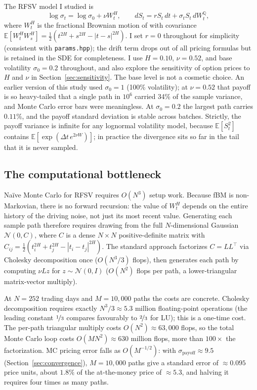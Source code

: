 The RFSV model I studied is \citep{gatheral2018volatility}
\begin{equation}
  \log\sigma_t = \log\sigma_0 + \nu W_t^H, \qquad
  dS_t = r S_t\,dt + \sigma_t S_t\, dW_t^{\mathbb{Q}},
\end{equation}
where $W_t^H$ is the fractional Brownian motion of \citet{mandelbrot1968fractional}
with covariance $\mathbb{E}[W_t^H W_s^H] = \tfrac{1}{2}(t^{2H}+s^{2H}-|t-s|^{2H})$.
I set $r = 0$ throughout for simplicity (consistent with \texttt{params.hpp}); the
drift term drops out of all pricing formulas but is retained in the SDE for
completeness.
I use $H = 0.10$, $\nu = 0.52$, and base volatility $\sigma_0 = 0.2$ throughout, and
also explore the sensitivity of option prices to $H$ and $\nu$ in
Section~\ref{sec:sensitivity}.  The base level is not a cosmetic choice.  An earlier
version of this study used $\sigma_0 = 1$ (100\% volatility); at $\nu = 0.52$ that
payoff is so heavy-tailed that a single path in $10^6$ carried 34\% of the sample
variance, and Monte Carlo error bars were meaningless.  At $\sigma_0 = 0.2$ the largest
path carries $0.11\%$, and the payoff standard deviation is stable across batches.
Strictly, the payoff variance is infinite for any lognormal volatility model, because
$\mathbb{E}[S_t^2]$ contains $\mathbb{E}[\exp(\Delta t\, e^{2\nu W})]$; in practice the
divergence sits so far in the tail that it is never sampled.

\subsection{The computational bottleneck}
\label{sec:bottleneck}

Naïve Monte Carlo for RFSV requires $O(N^3)$ setup work.  Because fBM is
non-Markovian, there is no forward recursion: the value of $W_t^H$ depends on the
entire history of the driving noise, not just its most recent value.  Generating each
sample path therefore requires drawing from the full $N$-dimensional Gaussian
$\mathcal{N}(0, C)$, where $C$ is a dense $N \times N$ positive-definite matrix with
$C_{ij} = \tfrac{1}{2}(t_i^{2H}+t_j^{2H}-|t_i-t_j|^{2H})$.  The standard approach
factorizes $C = LL^\top$ via Cholesky decomposition once ($O(N^3/3)$ flops), then
generates each path by computing $\nu Lz$ for $z \sim \mathcal{N}(0,I)$ ($O(N^2)$
flops per path, a lower-triangular matrix-vector multiply).

At $N = 252$ trading days and $M = 10{,}000$ paths the costs are concrete.  Cholesky
decomposition requires exactly $N^3/3 \approx 5.3$ million floating-point operations
(the leading constant $\nicefrac{1}{3}$ compares favourably to $\nicefrac{2}{3}$ for
LU); this is a one-time cost.  The per-path triangular multiply costs $O(N^2) \approx 63{,}000$ flops, so
the total Monte Carlo loop costs $O(MN^2) \approx 630$ million flops, more than
$100\times$ the factorization.  MC pricing error falls as $O(M^{-1/2})$: with
$\sigma_\mathrm{payoff} \approx 9.5$ (Section~\ref{sec:convergence}), $M = 10{,}000$
paths give a standard error of $\approx 0.095$ price units, about $1.8\%$ of the
at-the-money price of $\approx 5.3$, and halving it requires four times as many paths.

